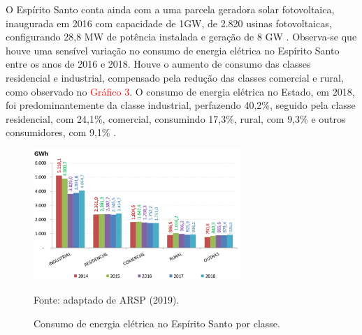 \begin{onehalfspace}
    \noindent O Espírito Santo conta ainda com a uma parcela geradora solar fotovoltaica, inaugurada em 2016 
    com capacidade de 1GW, de 2.820 usinas fotovoltaicas, configurando 28,8 MW de potência instalada 
    e geração de 8 GW \cite{AgenciadeRegulacaodeServicosPublicosdoEspiritoSanto-ARSP2018}.\vspace{0.3cm} \newline
    Observa-se que houve uma sensível variação no consumo de energia elétrica no Espírito Santo 
    entre os anos de 2016 e 2018. Houve o aumento de consumo das classes residencial e industrial, 
    compensado pela redução das classes comercial e rural, como observado no \textcolor{red}{Gráfico 3}. O consumo de 
    energia elétrica no Estado, em 2018, foi predominantemente da classe industrial, perfazendo 
    40,2\%, seguido pela classe residencial, com 24,1\%, comercial, consumindo 17,3\%, rural, 
    com 9,3\% e outros consumidores, com 9,1\% \cite{AgenciadeRegulacaodeServicosPublicosdoEspiritoSanto-ARSP2019}.
    
    \begin{figure}[ht]
        \centering
        \caption{\small Consumo de energia elétrica no Espírito Santo por classe.}
        \includegraphics[width=0.7\textwidth]{graphs/graph3_consumo_de_energia_eletrica_no_es_por_classe-arsp_2019.png}
        \par \small Fonte: adaptado de ARSP (2019).
        \label{Grafico 3}
    \end{figure}\vspace*{-0.1cm}


\end{onehalfspace}
